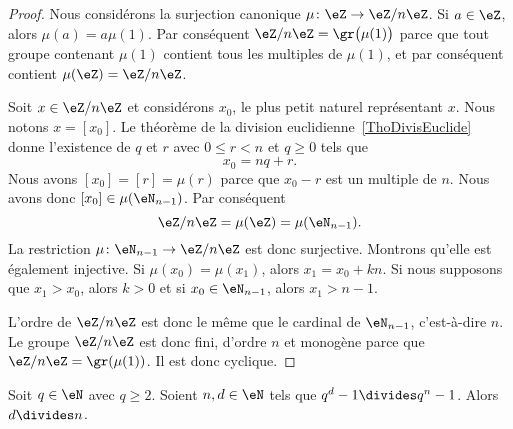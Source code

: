 \begin{proof}
	Nous considérons la surjection canonique \( \mu\colon \eZ\to \eZ/n\eZ\). Si \( a\in\eZ\), alors \( \mu(a)=a\mu(1)\). Par conséquent \( \eZ/n\eZ=\gr\bigl( \mu(1) \bigr)\) parce que tout groupe contenant \( \mu(1)\) contient tous les multiples de \( \mu(1)\), et par conséquent contient \( \mu(\eZ)=\eZ/n\eZ\).

	Soit \( x\in\eZ/n\eZ\) et considérons \( x_0\), le plus petit naturel représentant \( x\). Nous notons \( x=[x_0]\). Le théorème de la division euclidienne~\ref{ThoDivisEuclide} donne l'existence de \( q\) et \( r\) avec \( 0\leq r<n\) et \( q\geq 0\) tels que
	\begin{equation}
		x_0=nq+r.
	\end{equation}
	Nous avons \( [x_0]=[r]=\mu(r)\) parce que \( x_0-r\) est un multiple de \( n\). Nous avons donc \( [x_0]\in\mu(\eN_{n-1})\). Par conséquent
	\begin{equation}
		\eZ/n\eZ=\mu(\eZ)=\mu(\eN_{n-1}).
	\end{equation}
	La restriction \( \mu\colon \eN_{n-1}\to \eZ/n\eZ\) est donc surjective. Montrons qu'elle est également injective. Si \( \mu(x_0)=\mu(x_1)\), alors \( x_1=x_0+kn\). Si nous supposons que \( x_1>x_0\), alors \( k>0\) et si \( x_0\in\eN_{n-1}\), alors \( x_1>n-1\).

	L'ordre de \( \eZ/n\eZ\) est donc le même que le cardinal de \( \eN_{n-1}\), c'est-à-dire \( n\). Le groupe \( \eZ/n\eZ\) est donc fini, d'ordre \( n\) et monogène parce que \( \eZ/n\eZ=\gr(\mu(1))\). Il est donc cyclique.
\end{proof}

\begin{lemma}
	Soit \( q\in \eN\) avec \( q\geq 2\). Soient \( n,d\in \eN\) tels que \( q^d-1\divides q^n-1\). Alors \( d\divides n\).
\end{lemma}

